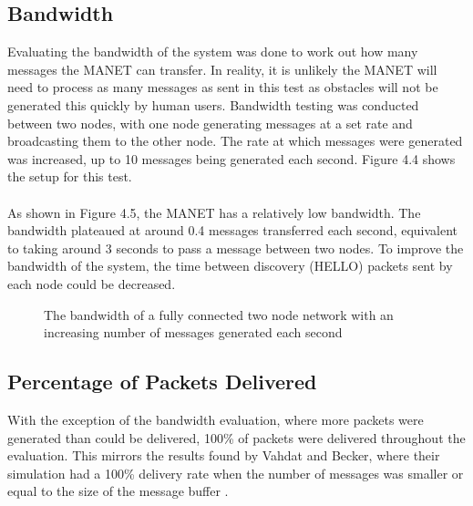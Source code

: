 \documentclass[12pt,a4paper]{report}
\makeatletter
\newenvironment{figurehere}
  {\def\@captype{figure}}
  {}
\makeatother
\begin{document}
\subsection{Bandwidth}
Evaluating the bandwidth of the system was done to work out how many messages the MANET can transfer. In reality, it is unlikely the MANET will need to process as many messages as sent in this test as obstacles will not be generated this quickly by human users. Bandwidth testing was conducted between two nodes, with one node generating messages at a set rate and broadcasting them to the other node. The rate at which messages were generated was increased, up to 10 messages being generated each second. Figure 4.4 shows the setup for this test. \\ \\
As shown in Figure 4.5, the MANET has a relatively low bandwidth. The bandwidth plateaued at around 0.4 messages transferred each second, equivalent to taking around 3 seconds to pass a message between two nodes. To improve the bandwidth of the system, the time between discovery (HELLO) packets sent by each node could be decreased. 
\begin{figurehere}
\begin{center}
\end{center}
\caption{The network used for bandwidth testing}
\end{figurehere}
\begin{figure}[h]
\begin{center}

\end{center}
\caption{The bandwidth of a fully connected two node network with an increasing number of messages generated each second}
\end{figure}
\newpage

\subsection{Percentage of Packets Delivered}
With the exception of the bandwidth evaluation, where more packets were generated than could be delivered, 100\% of packets were delivered throughout the evaluation. This mirrors the results found by Vahdat and Becker, where their simulation had a 100\% delivery rate when the number of messages was smaller or equal to the size of the message buffer \cite{epidemic}.\\
\end{document}
